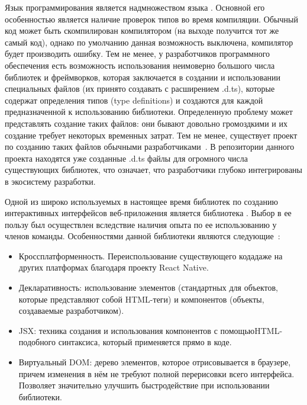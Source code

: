 Язык программирования \typescript является надмножеством языка \js. Основной его особенностью является наличие проверок типов во время компиляции. Обычный \js код может быть скомпилирован \typescript компилятором (на выходе получится тот же самый код), однако по умолчанию данная возможность выключена, компилятор будет производить ошибку. Тем не менее, у разработчиков программного обеспечения есть возможность использования неимоверно большого числа \js библиотек и фреймворков, которая заключается в создании и использовании специальных файлов (их принято создавать с расширением .d.ts), которые содержат определения типов (type definitions) и создаются для каждой предназначенной к использованию библиотеки. Определенную проблему может представлять создание таких файлов: они бывают довольно громоздкими и их создание требует некоторых временных затрат. Тем не менее, существует проект по созданию таких файлов обычными разработчиками~\cite{github_definitelytyped}. В репозитории данного проекта находятся уже созданные .d.ts файлы для огромного числа существующих библиотек, что означает, что \typescript разработчики глубоко интегрированы в экосистему \js разработки.

Одной из широко используемых в настоящее время библиотек по созданию интерактивных интерфейсов веб-приложения является библиотека \react. Выбор в ее пользу был осуществлен вследствие наличия опыта по ее использованию у членов команды. Особенностями данной библиотеки являются следующие~\cite{habr_react_introduction}:

\begin{itemize}
	\item Кроссплатформенность. Переиспользование существующего кода даже на других платформах благодаря проекту React Native.
	\item Декларативность: использование элементов (стандартных для \react \linebreak объектов, которые представляют собой HTML-теги) и компонентов (объекты, создаваемые разработчиком).
	\item JSX: техника создания и использования компонентов с помощью\linebreak HTML-подобного синтаксиса, который применяется прямо в \js коде.
	\item Виртуальный DOM: дерево \react элементов, которое отрисовывается в браузере, причем изменения в нём не требуют полной перерисовки всего интерфейса. Позволяет значительно улучшить быстродействие при использовании библиотеки.
\end{itemize}

